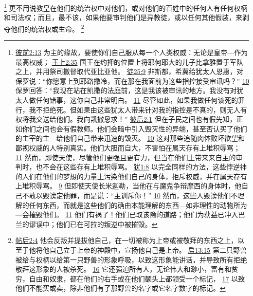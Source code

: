 \documentclass[12pt, a4paper, oneside]{ctexart}
\begin{document}
	\footnote {
		\href{https://biblehub.com/1_peter/2-13.htm}{彼前2:13} 为主的缘故，要使你们自己服从每一个人类权威：无论是皇帝---作为最高权威；
		\href{https://biblehub.com/1_kings/2-35.htm}{王上2:35} 国王在约押的位置上将耶何耶大的儿子比拿雅置于军队之上，并用祭司撒督取代亚比亚他。
		\href{https://biblehub.com/acts/25-9.htm}{徒25:9} 非斯都，希冀给犹太人恩惠，对保罗说：“你愿意上到耶路撒冷，而在那在我面前为这些指控接受审讯吗？”
		\href{https://biblehub.com/acts/25-10.htm}{10} 保罗回答：“我现在站在凯撒的法庭前，这是我该被审讯的地方。我没有对犹太人做任何错事，这你自己非常明白。
		\href{https://biblehub.com/acts/25-11.htm}{11} 尽管如此，如果我做任何该死的罪行，我不拒绝死。但如果由这些犹太人带来针对我的指控是不真的，则无人有权将我交送给他们。我向凯撒恳求！”
		\href{https://biblehub.com/2_peter/2-1.htm}{彼后2:1} 但在子民之间也有假先知，正如你们之间也会有假教师。他们会暗中引入毁灭性的异端，甚至否认买了他们的主宰的主---给他们自己带来迅速的毁灭。
		\href{https://biblehub.com/2_peter/2-10.htm}{10} 这对那些追随肉体败坏欲望和鄙视权威的人特别真实。他们大胆而自大，不害怕在属天存有上堆积辱骂；
		\href{https://biblehub.com/2_peter/2-11.htm}{11} 然而，即使天使，尽管他们更强且更有力，但当在他们上带来来自主的审判时，也不会在这些存有上堆积辱骂。
		\href{https://biblehub.com/jude/1-8.htm}{犹1:8} 以完全同样的方法，这些悖逆神的人们在他们的梦想的力量上污染他们自己的身体，拒斥权威，并在属天存有上堆积辱骂。
		\href{https://biblehub.com/jude/1-9.htm}{9} 但即使天使长米迦勒，当他在与魔鬼争辩摩西的身体时，他自己不敢以毁谤定他罪，而是说：“主训斥你！”
		\href{https://biblehub.com/jude/1-10.htm}{10} 然而，这些人毁谤他们不理解的任何东西，而就是这些他们的确由本能理解的东西---如非理性的动物所为---会摧毁他们。
		\href{https://biblehub.com/jude/1-11.htm}{11} 他们有祸了！他们已取该隐的道路；他们为获益已冲入巴兰的谬误中；他们已在可拉的叛逆中被摧毁。
	}
	更不用说教皇在他们的统治权中对他们，或对他们的百姓中的任何人有任何权柄和司法权；而且，最不该，如果他要审判他们是异教徒，或以任何其他假装，来剥夺他们的统治权或生命。
	\footnote {
		\href{https://biblehub.com/2_thessalonians/2-4.htm}{帖后2:4} 他会反叛并提拔他自己，在一切被称为上帝或被敬拜的东西之上，以至于他将他自己立于上帝的神殿中，宣扬他自己是上帝。
		\href{https://biblehub.com/revelation/13-15.htm}{启13:15} 第二只野兽被给与权柄以给第一只野兽的形象呼吸，以致这形象能讲话，并导致所有拒绝敬拜这形象的人被杀死。
		\href{https://biblehub.com/revelation/13-16.htm}{16} 它还强迫所有人，无论伟大和渺小，富有和贫穷，自由和奴隶，都在他们的右手或在他们额头上都领受一个标记，
		\href{https://biblehub.com/revelation/13-17.htm}{17} 以致他们不能买或卖，除非他们有了那野兽的名字或它名字数字的标记。
	}
\end{document}
